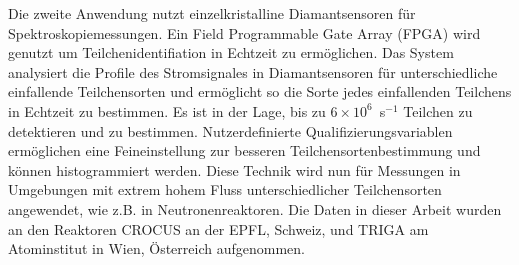 \begin{abstractger}
Die zweite Anwendung nutzt einzelkristalline Diamantsensoren f\"ur Spektroskopiemessungen. Ein Field Programmable Gate Array (FPGA) wird genutzt um Teilchenidentifiation in Echtzeit zu erm\"oglichen. Das System analysiert die Profile des Stromsignales in Diamantsensoren f\"ur unterschiedliche einfallende Teilchensorten und erm\"oglicht so die Sorte jedes einfallenden Teilchens in Echtzeit zu bestimmen. Es ist in der Lage, bis zu $6\times10^6$~s$^{-1}$ Teilchen zu detektieren und zu bestimmen. Nutzerdefinierte Qualifizierungsvariablen erm\"oglichen eine Feineinstellung zur besseren Teilchensortenbestimmung und k\"onnen histogrammiert werden. Diese Technik wird nun f\"ur Messungen in Umgebungen mit extrem hohem Fluss unterschiedlicher Teilchensorten angewendet, wie z.B. in Neutronenreaktoren. Die Daten in dieser Arbeit wurden an den Reaktoren CROCUS an der EPFL, Schweiz, und TRIGA am Atominstitut in Wien, \"Osterreich aufgenommen.
\end{abstractger}